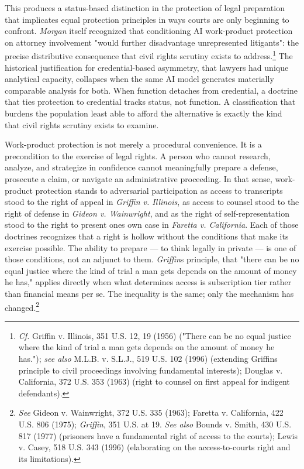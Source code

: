 \documentclass[
  12pt,
]{article}
\begin{document}
This produces a status-based distinction in the protection of legal
preparation that implicates equal protection principles in ways courts
are only beginning to confront. \emph{Morgan} itself recognized that
conditioning AI work-product protection on attorney involvement "would
further disadvantage unrepresented litigants": the precise distributive
consequence that civil rights scrutiny exists to address.\footnote{\emph{Cf.}
  Griffin v. Illinois, 351 U.S. 12, 19 (1956) ("There can be no equal
  justice where the kind of trial a man gets depends on the amount of
  money he has."); \emph{see also} M.L.B. v. S.L.J., 519 U.S. 102 (1996)
  (extending Griffin\textquotesingle s principle to civil proceedings
  involving fundamental interests); Douglas v. California, 372 U.S. 353
  (1963) (right to counsel on first appeal for indigent defendants).}
The historical justification for credential-based asymmetry, that
lawyers had unique analytical capacity, collapses when the same AI model
generates materially comparable analysis for both. When function
detaches from credential, a doctrine that ties protection to credential
tracks status, not function. A classification that burdens the
population least able to afford the alternative is exactly the kind that
civil rights scrutiny exists to examine.

Work-product protection is not merely a procedural convenience. It is a
precondition to the exercise of legal rights. A person who cannot
research, analyze, and strategize in confidence cannot meaningfully
prepare a defense, prosecute a claim, or navigate an administrative
proceeding. In that sense, work-product protection stands to adversarial
participation as access to transcripts stood to the right of appeal in
\emph{Griffin v. Illinois}, as access to counsel stood to the right of
defense in \emph{Gideon v. Wainwright}, and as the right of
self-representation stood to the right to present one\textquotesingle s
own case in \emph{Faretta v. California}. Each of those doctrines
recognizes that a right is hollow without the conditions that make its
exercise possible. The ability to prepare --- to think legally in
private --- is one of those conditions, not an adjunct to them.
\emph{Griffin}\textquotesingle s principle, that "there can be no equal
justice where the kind of trial a man gets depends on the amount of
money he has," applies directly when what determines access is
subscription tier rather than financial means per se. The inequality is
the same; only the mechanism has changed.\footnote{\emph{See} Gideon v.
  Wainwright, 372 U.S. 335 (1963); Faretta v. California, 422 U.S. 806
  (1975); \emph{Griffin}, 351 U.S. at 19. \emph{See also} Bounds v.
  Smith, 430 U.S. 817 (1977) (prisoners have a fundamental right of
  access to the courts); Lewis v. Casey, 518 U.S. 343 (1996)
  (elaborating on the access-to-courts right and its limitations).}
\end{document}
